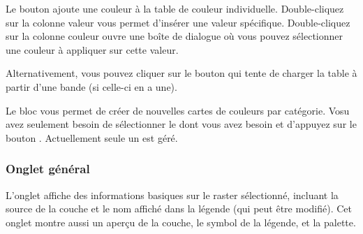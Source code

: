 Le bouton  ajoute une couleur \`a la table de couleur
individuelle. Double-cliquez sur la colonne valeur vous permet d'ins\'erer une
valeur sp\'ecifique. Double-cliquez sur la colonne couleur ouvre une bo\^ite de
dialogue   o\`u vous pouvez s\'electionner une
couleur \`a appliquer sur cette valeur.

Alternativement, vous pouvez cliquer sur le bouton
  qui tente de charger la table \`a partir d'une bande (si celle-ci en a
une).

Le bloc  vous permet de
cr\'eer de nouvelles cartes de couleurs par cat\'egorie. Vosu avez seulement besoin
de s\'electionner le  dont vous avez besoin
et d'appuyez sur le bouton . Actuellement seule un 
 est g\'er\'e.

\subsubsection{Onglet g\'en\'eral}\label{label_generaltab}

L'onglet  affiche des informations basiques sur le raster
s\'electionn\'e, incluant la source de la couche et le nom affich\'e dans la l\'egende
(qui peut \^etre modifi\'e). Cet onglet montre aussi un aper\c{c}u de la couche, le
symbol de la l\'egende, et la palette.

